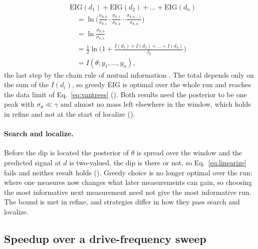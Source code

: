 \begin{equation}
  \begin{aligned}
  &\mathrm{EIG}(d_1)+\mathrm{EIG}(d_2)+\dots+\mathrm{EIG}(d_n)\\
  &\quad=\ln\Big(\frac{\sigma_{\theta,0}}{\sigma_{\theta,1}}\cdot\frac{\sigma_{\theta,1}}{\sigma_{\theta,2}}
    \cdots\frac{\sigma_{\theta,n-1}}{\sigma_{\theta,n}}\Big)\\
  &\quad=\ln\frac{\sigma_{\theta,0}}{\sigma_{\theta,n}}\\
  &\quad=\tfrac12\ln\Big(1+\frac{I(d_1)+I(d_2)+\dots+I(d_n)}{J_0}\Big)\\
  &\quad=I(\theta;y_1,\dots,y_n),
  \end{aligned}
  \label{eq:eig-telescope}
\end{equation}
the last step by the chain rule of mutual information \cite{cover2006}. The total depends only on the sum of the
$I(d_i)$, so greedy EIG is optimal over the whole run and reaches the data limit of Eq.~\eqref{eq:vantrees} (). Both results need the posterior
to be one peak with $\sigma_\theta\ll\gamma$ and almost no mass left elsewhere in the window, which holds in refine
and not at the start of localize ().

\paragraph{Search and localize.} Before the dip is located the posterior of $\theta$ is spread over the window and
the predicted signal at $d$ is two-valued, the dip is there or not, so Eq.~\eqref{eq:linearize} fails and neither
result holds (). Greedy choice is no longer optimal over the run: where one measures now changes what
later measurements can gain, so choosing the most informative next measurement need not give the most informative
run. The bound is met in refine, and strategies differ in how they pass search and localize.

\subsection{Speedup over a drive-frequency sweep}
\label{sec:speedup}

